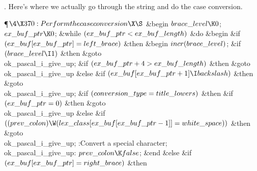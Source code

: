 .
Here's where we actually go through the string and do the case
conversion.

\Y\P$\4\X370:Perform the case conversion\X\S$\6
\&{begin} $\\{brace\_level}\K0$;\6
$\\{ex\_buf\_ptr}\K0$;\6
\&{while} $(\\{ex\_buf\_ptr}<\\{ex\_buf\_length})$ \1\&{do}\6
\&{begin} \&{if} $(\\{ex\_buf}[\\{ex\_buf\_ptr}]=\\{left\_brace})$ \1%
\&{then}\6
\&{begin} $\\{incr}(\\{brace\_level})$;\6
\&{if} $(\\{brace\_level}\I1)$ \1\&{then}\5
\&{goto} \\{ok\_pascal\_i\_give\_up};\2\6
\&{if} $(\\{ex\_buf\_ptr}+4>\\{ex\_buf\_length})$ \1\&{then}\5
\&{goto} \\{ok\_pascal\_i\_give\_up}\6
\4\&{else} \&{if} $(\\{ex\_buf}[\\{ex\_buf\_ptr}+1]\I\\{backslash})$ \1\&{then}%
\5
\&{goto} \\{ok\_pascal\_i\_give\_up};\2\2\6
\&{if} $(\\{conversion\_type}=\\{title\_lowers})$ \1\&{then}\6
\&{if} $(\\{ex\_buf\_ptr}=0)$ \1\&{then}\5
\&{goto} \\{ok\_pascal\_i\_give\_up}\6
\4\&{else} \&{if} $((\\{prev\_colon})\W(\\{lex\_class}[\\{ex\_buf}[\\{ex\_buf%
\_ptr}-1]]=\\{white\_space}))$ \1\&{then}\5
\&{goto} \\{ok\_pascal\_i\_give\_up};\2\2\2\6
:Convert a special character\X;\6
\4\\{ok\_pascal\_i\_give\_up}: $\\{prev\_colon}\K\\{false}$;\6
\&{end}\6
\4\&{else} \&{if} $(\\{ex\_buf}[\\{ex\_buf\_ptr}]=\\{right\_brace})$ \1\&{then}%

